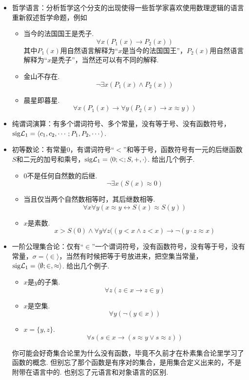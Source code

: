 \documentclass[main.tex]{subfiles}
\begin{document}
\begin{itemize}
    \item 哲学语言：分析哲学这个分支的出现使得一些哲学家喜欢使用数理逻辑的语言重新叙述哲学命题，例如
    \begin{itemize}
        \item 当今的法国国王是秃子.
        \[\forall x (P_1(x) \to P_2(x))\]
        其中\(P_1(x)\)用自然语言解释为“\(x\)是当今的法国国王”，\(P_2(x)\)用自然语言解释为“\(x\)是秃子”，当然还可以有不同的解释.
        \item 金山不存在.
        \[\neg \exists x(P_1(x) \wedge P_2(x))\]
        \item 晨星即暮星.
        \[\forall x(P_1(x) \to \forall y (P_2(x) \to x \approx y))\]
    \end{itemize}
    \item 纯谓词演算：有多个谓词符号、多个常量，没有等于号、没有函数符号，\({\rm sig}\mathcal{L}_1 = \langle c_1, c_2, \cdots; P_1, P_2, \cdots \rangle\).
    \item 初等数论：有常量\(0\)，有谓词符号“\(<\)”和等于号，函数符号有一元的后继函数\(S\)和二元的加号和乘号，\({\rm sig}\mathcal{L}_1 = \langle 0; <; S, +, \cdot \rangle\). 给出几个例子.
    \begin{itemize}
        \item \(0\)不是任何自然数的后继.
        \[\neg \exists x (S(x) \approx 0)\]
        \item 当且仅当两个自然数相等时，其后继数相等.
        \[\forall x \forall y(x \approx y \leftrightarrow S(x) \approx S(y))\]
        \item \(x\)是素数.
        \[x > S(0) \wedge \forall y \forall z ((y < x \wedge z < x) \to \neg(y \cdot z \approx x) \]
    \end{itemize}
    \item 一阶公理集合论：仅有“\(\in\)”一个谓词符号，没有函数符号，没有等于号，没有常量，\(\sigma = \langle \in \rangle\)，当然有时候把等于号放进来，把空集当常量，\({\rm sig}\mathcal{L}_1 = \langle \emptyset; \in, \approx \rangle\). 给出几个例子.
    \begin{itemize}
        \item \(x\)是\(y\)的子集.
        \[\forall z (z \in x \to z \in y)\]
        \item \(x\)是空集.
        \[\forall y (\neg (y \in x))\]
        \item \(x=\{y,z\}\).
        \[\forall s(s \in x \to (s \approx y \vee s \approx z))\]
    \end{itemize}
    你可能会好奇集合论里为什么没有函数，毕竟不久前才在朴素集合论里学习了函数的概念. 但别忘了那个函数是有序对的集合，是用集合定义出来的，不是附带在语言中的. 也别忘了元语言和对象语言的区别. 
\end{itemize}
\end{document}
